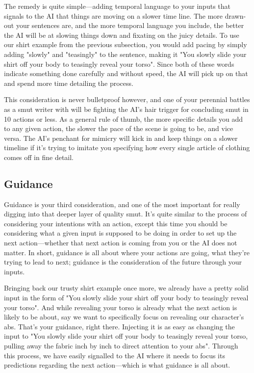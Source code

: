 ﻿\documentclass[Coomer-main.tex]{subfiles}
\begin{document}
The remedy is quite simple—adding temporal language to your inputs that signals to the AI that things are moving on a slower time line.
The more drawn-out your sentences are, and the more temporal language you include, the better the AI will be at slowing things down and fixating on the juicy details.
To use our shirt example from the previous subsection, you would add pacing by simply adding "slowly" and "teasingly" to the sentence, making it "You slowly slide your shirt off your body to teasingly reveal your torso".
Since both of these words indicate something done carefully and without speed, the AI will pick up on that and spend more time detailing the process.

This consideration is never bulletproof however, and one of your perennial battles as a smut writer with \aid will be fighting the AI's hair trigger for concluding smut in 10 actions or less.
As a general rule of thumb, the more specific details you add to any given action, the slower the pace of the scene is going to be, and vice versa.
The AI’s penchant for mimicry will kick in and keep things on a slower timeline if it’s trying to imitate you specifying how every single article of clothing comes off in fine detail.

\subsection{Guidance}

Guidance is your third consideration, and one of the most important for really digging into that deeper layer of quality smut.
It's quite similar to the process of considering your intentions with an action, except this time you should be considering what a given input is supposed to be doing in order to set up the next action—whether that next action is coming from you or the AI does not matter.
In short, guidance is all about where your actions are going, what they’re trying to lead to next; guidance is the consideration of the future through your inputs.

Bringing back our trusty shirt example once more, we already have a pretty solid input in the form of "You slowly slide your shirt off your body to teasingly reveal your torso".
And while revealing your torso is already what the next action is likely to be about, say we want to specifically focus on revealing our character's abs.
That's your guidance, right there.
Injecting it is as easy as changing the input to "You slowly slide your shirt off your body to teasingly reveal your torso, pulling away the fabric inch by inch to direct attention to your abs".
Through this process, we have easily signalled to the AI where it needs to focus its predictions regarding the next action—which is what guidance is all about.
\end{document}
